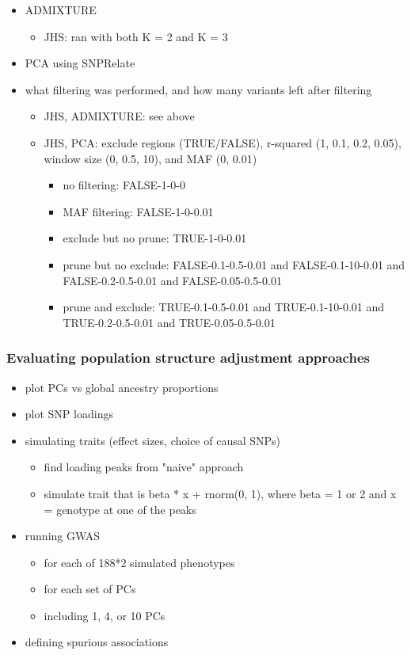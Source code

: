 \documentclass[12pt]{article}
\begin{document}
\begin{itemize}
\item ADMIXTURE
	\begin{itemize}
	\item JHS: ran with both K = 2 and K = 3
	\end{itemize}
\item PCA using SNPRelate
\item what filtering was performed, and how many variants left after filtering
	\begin{itemize}
	\item JHS, ADMIXTURE: see above
	\item JHS, PCA: exclude regions (TRUE/FALSE), r-squared (1, 0.1, 0.2, 0.05), window size (0, 0.5, 10), and MAF (0, 0.01) 
		\begin{itemize}
		\item no filtering: FALSE-1-0-0
		\item MAF filtering: FALSE-1-0-0.01
		\item exclude but no prune: TRUE-1-0-0.01
		\item prune but no exclude: FALSE-0.1-0.5-0.01 and FALSE-0.1-10-0.01 and FALSE-0.2-0.5-0.01 and FALSE-0.05-0.5-0.01
		\item prune and exclude: TRUE-0.1-0.5-0.01 and TRUE-0.1-10-0.01 and TRUE-0.2-0.5-0.01 and TRUE-0.05-0.5-0.01
		\end{itemize}
	\end{itemize}
\end{itemize}


\subsubsection{Evaluating population structure adjustment approaches}

\begin{itemize}
\item plot PCs vs global ancestry proportions
\item plot SNP loadings 
\end{itemize}


\begin{itemize}
\item simulating traits (effect sizes, choice of causal SNPs)
	\begin{itemize}
	\item find loading peaks from "naive" approach
	\item simulate trait that is beta * x + rnorm(0, 1), where beta = 1 or 2 and x = genotype at one of the peaks
	\end{itemize}
\item running GWAS
	\begin{itemize}
	\item for each of 188*2 simulated phenotypes
	\item for each set of PCs
	\item including 1, 4, or 10 PCs
	\end{itemize}
\item defining spurious associations
\end{itemize}
\end{document}
